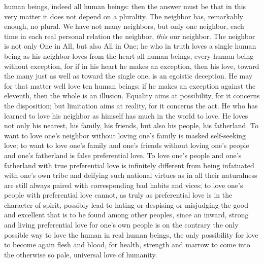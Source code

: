 \documentclass[12pt,a4paper,openany]{book}
\newcommand{\opage}[1]{\marginnote{\footnotesize\textit{[#1]}}}
\begin{document}
human beings, indeed all human beings: then the answer must be that
in this very matter it does not depend on a plurality.
The neighbor has, remarkably enough, no plural. We have
not many neighbors, but only one neighbor, each time in
each real personal relation the neighbor, \emph{this} our neighbor.
The neighbor is not only One in All, but also All in
One; he who in truth loves a single human being as his
neighbor loves from the heart all human beings, every human being
\setcounter{footnote}{0}%
\opage{516}without exception, for if in his heart he makes an exception,
then his love, toward the many just as well
as toward the single one, is an egoistic deception. He may for
that matter well love ten human beings; if he
makes an exception against the eleventh, then the whole is
an illusion. Equality aims at possibility, for it
concerns the disposition; but limitation aims at reality,
for it concerns the act. He who has
learned to love his neighbor as himself has much in the world
to love. He loves not only his nearest, his
family, his friends, but also his people, his fatherland.
To want to love one's neighbor without loving one's family is
masked self-seeking love; to want to love one's family and
one's friends without loving one's people and one's fatherland is
false preferential love. To love one's people and one's fatherland
with true preferential love is infinitely different from
being infatuated with one's own tribe and deifying such national
virtues as in all their naturalness are still always paired
with corresponding bad habits and vices; to love one's people
with preferential love cannot, as truly as preferential love is in the
character of spirit, possibly lead to hating or
despising or misjudging the good and excellent that
is to be found among other peoples, since an inward, strong and living
preferential love for one's own people is on the contrary the only
possible way to love the human in real human beings,
the only possibility for love to become again
flesh and blood, for health, strength
and marrow to come into the otherwise so pale, universal love of humanity.
\end{document}
